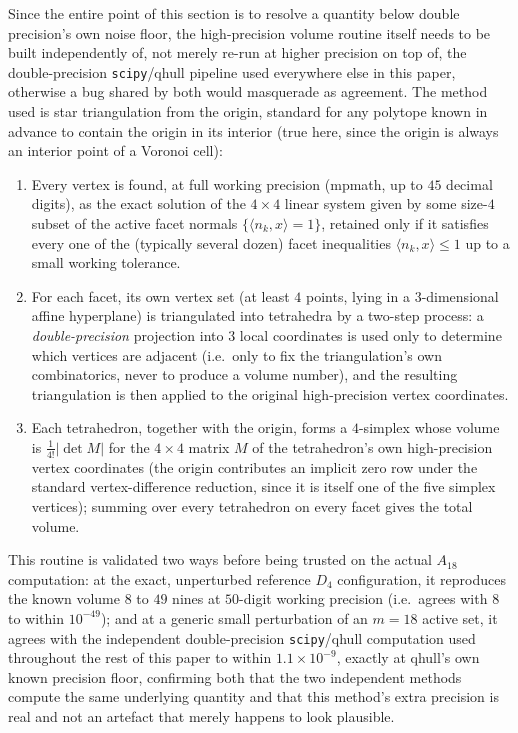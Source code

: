 \documentclass[11pt,reqno]{amsart}
\renewcommand{\_}{\origunderscore\allowbreak}
\numberwithin{equation}{section}
\theoremstyle{plain}
\theoremstyle{definition}
\theoremstyle{remark}
\begin{document}
Since the entire point of this section is to resolve a quantity below
double precision's own noise floor, the high-precision volume routine
itself needs to be built independently of, not merely re-run at higher
precision on top of, the double-precision \texttt{scipy}/qhull pipeline
used everywhere else in this paper, otherwise a bug shared by both
would masquerade as agreement. The method used is star triangulation
from the origin, standard for any polytope known in advance to contain
the origin in its interior (true here, since the origin is always an
interior point of a Voronoi cell):
\begin{enumerate}[leftmargin=2em]
\item Every vertex is found, at full working precision (mpmath, up to
$45$ decimal digits), as the exact solution of the $4\times4$ linear
system given by some size-$4$ subset of the active facet normals
$\{\langle n_k,x\rangle=1\}$, retained only if it satisfies every one
of the (typically several dozen) facet inequalities
$\langle n_k,x\rangle\le1$ up to a small working tolerance.
\item For each facet, its own vertex set (at least $4$ points, lying in
a $3$-dimensional affine hyperplane) is triangulated into
tetrahedra by a two-step process: a \emph{double-precision} projection
into $3$ local coordinates is used only to determine which vertices are
adjacent (i.e.\ only to fix the triangulation's own combinatorics, never
to produce a volume number), and the resulting triangulation is then
applied to the original high-precision vertex coordinates.
\item Each tetrahedron, together with the origin, forms a $4$-simplex
whose volume is $\tfrac1{4!}|\det M|$ for the $4\times4$ matrix $M$ of
the tetrahedron's own high-precision vertex coordinates (the origin
contributes an implicit zero row under the standard vertex-difference
reduction, since it is itself one of the five simplex vertices);
summing over every tetrahedron on every facet gives the total volume.
\end{enumerate}
This routine is validated two ways before being trusted on the actual
$A_{18}$ computation: at the exact, unperturbed reference $D_4$
configuration, it reproduces the known volume $8$ to $49$ nines at
$50$-digit working precision (i.e.\ agrees with $8$ to within
$10^{-49}$); and at a generic small perturbation of an $m=18$ active
set, it agrees with the independent double-precision
\texttt{scipy}/qhull computation used throughout the rest of this paper
to within $1.1\times10^{-9}$, exactly at qhull's own known precision
floor, confirming both that the two independent methods compute the
same underlying quantity and that this method's extra precision is real and not an artefact that merely happens to look plausible.
\end{document}
